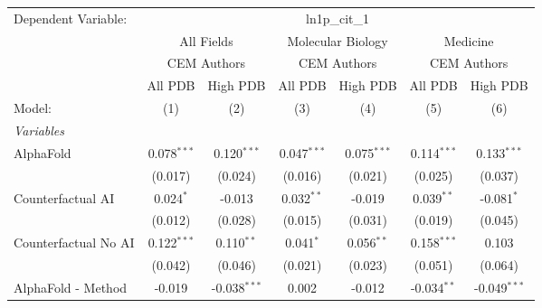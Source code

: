 \begingroup
\centering
\begin{tabular}{lcccccc}
   \tabularnewline \midrule \midrule
   Dependent Variable: & \multicolumn{6}{c}{ln1p\_cit\_1}\\
 & \multicolumn{2}{c}{All Fields} & \multicolumn{2}{c}{Molecular Biology} & \multicolumn{2}{c}{Medicine} \\
\cmidrule(lr){2-3} \cmidrule(lr){4-5} \cmidrule(lr){6-7}
 & \multicolumn{2}{c}{CEM Authors} & \multicolumn{2}{c}{CEM Authors} & \multicolumn{2}{c}{CEM Authors} \\
\cmidrule(lr){2-3} \cmidrule(lr){4-5} \cmidrule(lr){6-7}
 & \multicolumn{1}{c}{All PDB} & \multicolumn{1}{c}{High PDB} & \multicolumn{1}{c}{All PDB} & \multicolumn{1}{c}{High PDB} & \multicolumn{1}{c}{All PDB} & \multicolumn{1}{c}{High PDB} \\
\cmidrule(lr){2-2} \cmidrule(lr){3-3} \cmidrule(lr){4-4} \cmidrule(lr){5-5} \cmidrule(lr){6-6} \cmidrule(lr){7-7}
   Model:                                                     & (1)           & (2)            & (3)           & (4)           & (5)           & (6)\\  
   \midrule
   \emph{Variables}\\
   AlphaFold                                                  & 0.078$^{***}$ & 0.120$^{***}$  & 0.047$^{***}$ & 0.075$^{***}$ & 0.114$^{***}$ & 0.133$^{***}$\\   
                                                              & (0.017)       & (0.024)        & (0.016)       & (0.021)       & (0.025)       & (0.037)\\   
   Counterfactual AI                                          & 0.024$^{*}$   & -0.013         & 0.032$^{**}$  & -0.019        & 0.039$^{**}$  & -0.081$^{*}$\\   
                                                              & (0.012)       & (0.028)        & (0.015)       & (0.031)       & (0.019)       & (0.045)\\   
   Counterfactual No AI                                       & 0.122$^{***}$ & 0.110$^{**}$   & 0.041$^{*}$   & 0.056$^{**}$  & 0.158$^{***}$ & 0.103\\   
                                                              & (0.042)       & (0.046)        & (0.021)       & (0.023)       & (0.051)       & (0.064)\\   
   AlphaFold - Method                                         & -0.019        & -0.038$^{***}$ & 0.002         & -0.012        & -0.034$^{**}$ & -0.049$^{***}$\\   

\end{tabular}
